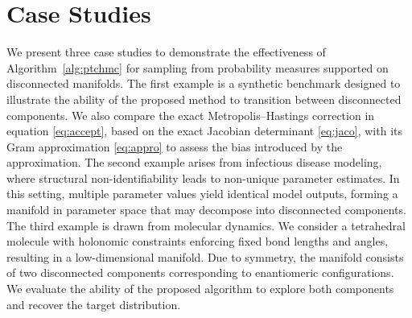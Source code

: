 \documentclass[12pt]{article}
\begin{document}
\section{Case Studies}\label{sec5}

We present three case studies to demonstrate the effectiveness of Algorithm~\ref{alg:ptchmc} for sampling from probability measures supported on disconnected manifolds.
The first example is a synthetic benchmark designed to illustrate the ability of the proposed method to transition between disconnected components. We also compare the exact Metropolis--Hastings correction in equation \eqref{eq:accept}, based on the exact Jacobian determinant \eqref{eq:jaco}, with its Gram approximation \eqref{eq:appro} to assess the bias introduced by the approximation.
The second example arises from infectious disease modeling, where structural non-identifiability leads to non-unique parameter estimates. In this setting, multiple parameter values yield identical model outputs, forming a manifold in parameter space that may decompose into disconnected components. 
The third example is drawn from molecular dynamics. We consider a tetrahedral molecule with holonomic constraints enforcing fixed bond lengths and angles, resulting in a low-dimensional manifold. Due to symmetry, the manifold consists of two disconnected components corresponding to enantiomeric configurations. We evaluate the ability of the proposed algorithm to explore both components and recover the target distribution.
\end{document}
